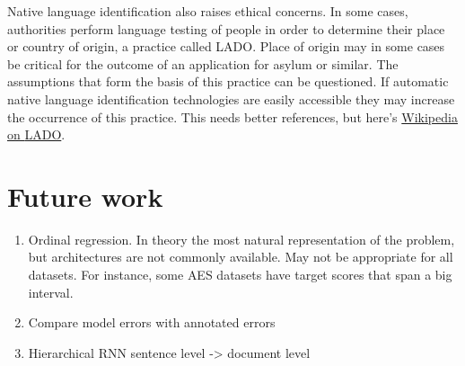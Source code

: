 Native language identification also raises ethical concerns. In some cases,
authorities perform language testing of people in order to determine their
place or country of origin, a practice called \ac{LADO}. Place of origin may
in some cases be critical for the outcome of an application
for asylum or similar. The assumptions that form the basis of this practice
can be questioned. If automatic native language identification technologies
are easily accessible they may increase the occurrence of this practice. This
needs better references, but here's
\href{https://en.wikipedia.org/wiki/Language_analysis_for_the_determination_of_origin}{Wikipedia
on \ac{LADO}}.


\section{Future work}

\begin{enumerate}
    \item Ordinal regression. In theory the most natural representation of the
          problem, but architectures are not commonly available. May not be
          appropriate for all datasets. For instance, some \ac{AES} datasets
          have target scores that span a big interval.
    \item Compare model errors with annotated errors
    \item Hierarchical RNN sentence level -> document level
\end{enumerate}
